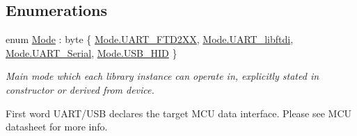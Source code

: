 \subsection*{Enumerations}
\begin{DoxyCompactItemize}
\item 
enum \mbox{\hyperlink{namespace_b_s_l430___n_e_t_aa1c6981cb6f279b5491d861ca555a1d7}{Mode}} \+: byte \{ \mbox{\hyperlink{namespace_b_s_l430___n_e_t_aa1c6981cb6f279b5491d861ca555a1d7a1e8f7424bc8f1fb2d9593f1f05e27bc8}{Mode.\+U\+A\+R\+T\+\_\+\+F\+T\+D2\+XX}}, 
\mbox{\hyperlink{namespace_b_s_l430___n_e_t_aa1c6981cb6f279b5491d861ca555a1d7ad0f63e0e18723fee410b62fe202028a1}{Mode.\+U\+A\+R\+T\+\_\+libftdi}}, 
\mbox{\hyperlink{namespace_b_s_l430___n_e_t_aa1c6981cb6f279b5491d861ca555a1d7a766287f492a16ccdf7b4b2a8a5ba125b}{Mode.\+U\+A\+R\+T\+\_\+\+Serial}}, 
\mbox{\hyperlink{namespace_b_s_l430___n_e_t_aa1c6981cb6f279b5491d861ca555a1d7abc0998f5c74151a4a3dfaa6e2b0af993}{Mode.\+U\+S\+B\+\_\+\+H\+ID}}
 \}
\begin{DoxyCompactList}\small\item\em Main mode which each library instance can operate in, explicitly stated in constructor or derived from device. 

First word U\+A\+R\+T/\+U\+SB declares the target M\+CU data interface. Please see M\+CU datasheet for more info. 


\end{DoxyCompactList}
\end{DoxyCompactItemize}
